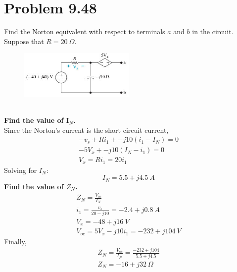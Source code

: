 \documentclass[12pt]{article}
\begin{document}
    \section*{Problem 9.48}
    Find the Norton equivalent with respect to terminals $a$ and $b$ in the
    circuit. Suppose that $R = 20\ \Omega$.
    \begin{figure}[h]
        \centering
        \includegraphics[width=0.5\textwidth]{9.48 Circuit.png}
    \end{figure}
    \\
    \textbf{Find the value of I$_{N}$.} \\
    Since the Norton's current is the short circuit current,
    \begin{gather*}
        -v_{s} + Ri_1 + -j 10 (i_1 - I_N) = 0 \\
        -5 V_{x} + -j 10 (I_N - i_1) = 0 \\
        V_{x} = R i_1 = 20 i_1
    \end{gather*}
    Solving for $I_{N}$:
    \[
        \boxed{I_{N} = 5.5 + j 4.5\ A}
    \]
    \textbf{Find the value of $Z_{N}$.}
    \begin{gather*}
        Z_{N} = \frac{V_{oc}}{I_{N}} \\
        i_1 = \frac{v_{s}}{20 - j 10} = -2.4 + j 0.8\ A \\
        V_{x} = -48 + j 16\ V \\
        V_{oc} = 5 V_{x} - j 10 i_1 = -232 + j 104\ V
    \end{gather*}
    Finally,
    \begin{gather*}
        Z_{N} = \frac{V_{oc}}{I_{N}} = \frac{-232 + j 104}{5.5 + j 4.5} \\
        \boxed{Z_{N} = -16 + j 32\ \Omega}
    \end{gather*}
    \newpage
\end{document}
